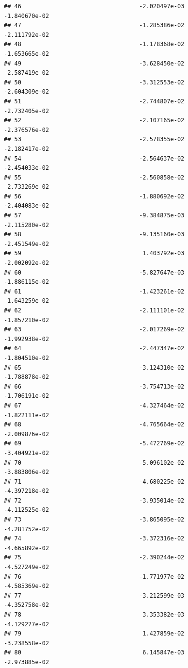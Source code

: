 \documentclass[
]{article}
\begin{document}
\begin{verbatim}
## 46                                  -2.020497e-03          -1.840670e-02
## 47                                  -1.285386e-02          -2.111792e-02
## 48                                  -1.178368e-02          -1.653665e-02
## 49                                  -3.628450e-02          -2.587419e-02
## 50                                  -3.312553e-02          -2.604309e-02
## 51                                  -2.744807e-02          -2.732405e-02
## 52                                  -2.107165e-02          -2.376576e-02
## 53                                  -2.578355e-02          -2.182417e-02
## 54                                  -2.564637e-02          -2.454033e-02
## 55                                  -2.560858e-02          -2.733269e-02
## 56                                  -1.880692e-02          -2.404083e-02
## 57                                  -9.384875e-03          -2.115280e-02
## 58                                  -9.135160e-03          -2.451549e-02
## 59                                   1.403792e-03          -2.002092e-02
## 60                                  -5.827647e-03          -1.886115e-02
## 61                                  -1.423261e-02          -1.643259e-02
## 62                                  -2.111101e-02          -1.857210e-02
## 63                                  -2.017269e-02          -1.992938e-02
## 64                                  -2.447347e-02          -1.804510e-02
## 65                                  -3.124310e-02          -1.788878e-02
## 66                                  -3.754713e-02          -1.706191e-02
## 67                                  -4.327464e-02          -1.822111e-02
## 68                                  -4.765664e-02          -2.009876e-02
## 69                                  -5.472769e-02          -3.404921e-02
## 70                                  -5.096102e-02          -3.883806e-02
## 71                                  -4.680225e-02          -4.397218e-02
## 72                                  -3.935014e-02          -4.112525e-02
## 73                                  -3.865095e-02          -4.281752e-02
## 74                                  -3.372316e-02          -4.665892e-02
## 75                                  -2.390244e-02          -4.527249e-02
## 76                                  -1.771977e-02          -4.585369e-02
## 77                                  -3.212599e-03          -4.352758e-02
## 78                                   3.353382e-03          -4.129277e-02
## 79                                   1.427859e-02          -3.238558e-02
## 80                                   6.145847e-03          -2.973885e-02

\end{verbatim}
\end{document}
